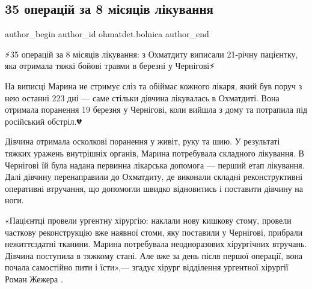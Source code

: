  
 
 
 
 
 
\subsection{35 операцій за 8 місяців лікування}
\label{sec:02_12_2022.fb.ohmatdet.bolnica.1.35_operacij_divchynka}
 
\ifcmt
 author_begin
   author_id ohmatdet.bolnica
 author_end
\fi

⚡️35 операцій за 8 місяців лікування: з Охматдиту виписали 21-річну пацієнтку,
яка отримала тяжкі бойові травми в березні у Чернігові⚡️

На виписці Марина не стримує сліз та обіймає кожного лікаря, який був поруч з
нею останні 223 дні — саме стільки дівчина лікувалась в Охматдиті. Вона
отримала поранення 19 березня у Чернігові, коли вийшла з дому та потрапила під
російський обстріл.💔


Дівчина отримала осколкові поранення у живіт, руку та шию. У результаті тяжких
уражень внутрішніх органів, Марина потребувала складного лікування. В Чернігові
їй була надана первинна лікарська допомога — перший етап лікування. Далі
дівчину перенаправили до Охматдиту, де виконали складні реконструктивні
оперативні втручання, що допомогли швидко відновитись і поставити дівчину на
ноги.🙏🏻


«Пацієнтці провели ургентну хірургію: наклали нову кишкову стому, провели
часткову реконструкцію вже наявної стоми, яку поставили у Чернігові, прибрали
нежиттєздатні тканини. Марина потребувала неодноразових хірургічних втручань.
Дівчина поступила в тяжкому стані. Але вже за день після першої операції, вона
почала самостійно пити і їсти»,— згадує хірург відділення ургентної хірургії
Роман Жежера .💪🏻

